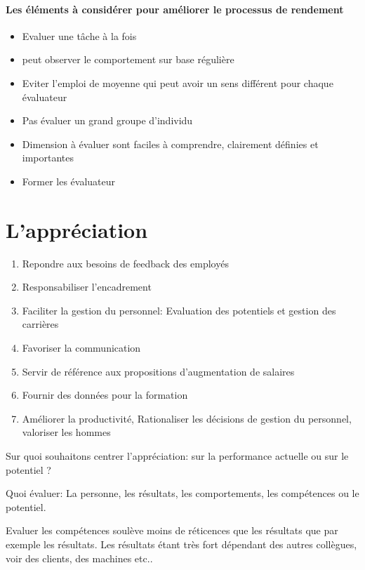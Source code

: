 \paragraph{Les éléments à considérer pour améliorer le processus de rendement}
\begin{itemize}
    \item Evaluer une tâche à la fois
    \item peut observer le comportement sur base régulière
    \item Eviter l'emploi de moyenne qui peut avoir un sens différent pour chaque évaluateur
    \item Pas évaluer un grand groupe d'individu
    \item Dimension à évaluer sont faciles à comprendre, clairement définies et importantes
    \item Former les évaluateur
    
\end{itemize}


\section{L'appréciation} \cite{gestionressourceshumaine2007}


\begin{enumerate}
    \item Repondre aux besoins de feedback des employés
    \item Responsabiliser l'encadrement
    \item Faciliter la gestion du personnel: Evaluation des potentiels et gestion des carrières
    \item Favoriser la communication
    \item Servir de référence aux propositions d'augmentation de salaires
    \item Fournir des données pour la formation
    \item Améliorer la productivité, Rationaliser les décisions de gestion du personnel, valoriser les hommes
\end{enumerate} 

Sur quoi souhaitons centrer l'appréciation: sur la performance actuelle ou sur le potentiel ? 

Quoi évaluer: La personne, les résultats, les comportements, les compétences ou le potentiel. 

Evaluer les compétences soulève moins de réticences que les résultats que par exemple les résultats. 
Les résultats étant très fort dépendant des autres collègues, voir des clients, des machines etc.. 

